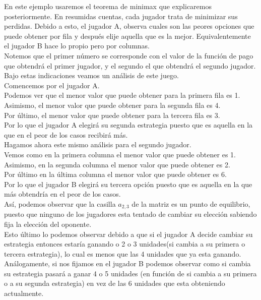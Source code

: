 \documentclass[10pt,a4paper]{book}
\begin{document}
En este ejemplo usaremos el teorema de minimax que explicaremos posteriormente. En resumidas cuentas, cada jugador trata de minimizar sus perdidas. Debido a esto, el jugador A, observa cuales son las peores opciones que puede obtener por fila y después elije aquella que es la mejor. Equivalentemente el jugador B hace lo propio pero por columnas. \\

Notemos que el primer número se corresponde con el valor de la función de pago que obtendrá el primer jugador, y el segundo el que obtendrá el segundo jugador.\\

Bajo estas indicaciones veamos un análisis de este juego. \\
Comencemos por el jugador A.\\
Podemos ver que el menor valor que puede obtener para la primera fila es 1. \\
Asimismo, el menor valor que puede obtener para la segunda fila es 4.\\
Por último, el menor valor que puede obtener para la tercera fila es 3.\\
Por lo que el jugador A elegirá su segunda estrategia puesto que es aquella en la que en el peor de los casos recibirá más.\\


Hagamos ahora este mismo análisis para el segundo jugador.\\
Vemos como en la primera columna el menor valor que puede obtener es 1.\\
Asimismo, en la segunda columna el menor valor que puede obtener es 2.\\
Por último en la última columna el menor valor que puede obtener es 6.\\

Por lo que el jugador B elegirá su tercera opción puesto que es aquella en la que más obtendría en el peor de los casos.\\

Así, podemos observar que la casilla $a_{2,3}$ de la matriz es un punto de equilibrio, puesto que ninguno de los jugadores esta tentado de cambiar su elección sabiendo fija la elección del oponente. \\
Esto último lo podemos observar debido a que si el jugador A decide cambiar su estrategia entonces estaría ganando o 2 o 3 unidades(si cambia a su primera o tercera estrategia), lo cual es menos que las 4 unidades que ya esta ganando. Análogamente, si nos fijamos en el jugador B podemos observar como si cambia su estrategia pasará a ganar 4 o 5 unidades (en función de si cambia a su primera o a su segunda estrategia) en vez de las 6 unidades que esta obteniendo actualmente.\\
\end{document}
